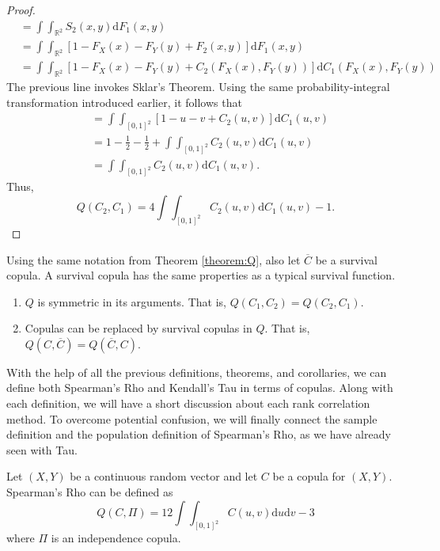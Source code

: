 \begin{proof}
\begin{align*}
        &=\int\int_{\mathbb{R}^2}S_2\left(x,y\right)\mathrm{d}F_1\left(x,y\right)\\
        &=\int\int_{\mathbb{R}^2}\left[1-F_X\left(x\right)-F_Y\left(y\right)+F_2\left(x,y\right)\right]\mathrm{d}F_1\left(x,y\right)\\
        &=\int\int_{\mathbb{R}^2}\left[1-F_X\left(x\right)-F_Y\left(y\right)+C_2\left(F_X\left(x\right),F_Y\left(y\right)\right)\right]\mathrm{d}C_1\left(F_X\left(x\right),F_Y\left(y\right)\right)
    \end{align*}
    The previous line invokes Sklar's Theorem. Using the same probability-integral transformation introduced earlier, it follows that
    \begin{align*}
        &=\int\int_{[0,1]^2}\left[1-u-v+C_2\left(u,v\right)\right]\mathrm{d}C_1\left(u,v\right)\\
        &=1-\frac{1}{2}-\frac{1}{2}+\int\int_{[0,1]^2}C_2\left(u,v\right)\mathrm{d}C_1\left(u,v\right)\\
        &=\int\int_{[0,1]^2}C_2\left(u,v\right)\mathrm{d}C_1\left(u,v\right).
    \end{align*}
    Thus, $$Q\left(C_2,C_1\right)=4\int\int_{[0,1]^2}C_2\left(u,v\right)\mathrm{d}C_1\left(u,v\right)-1.$$
\end{proof}
\begin{corollary}
    Using the same notation from Theorem \ref{theorem:Q}, also let $\overline{C}$ be a survival copula. A survival copula has the same properties as a typical survival function.
    \begin{enumerate}
        \item $Q$ is symmetric in its arguments. That is, $Q\left(C_1,C_2\right)=Q\left(C_2,C_1\right)$.
        \item Copulas can be replaced by survival copulas in $Q$. That is, $Q\left(C,\overline{C}\right)=Q\left(\overline{C},C\right)$.
    \end{enumerate}
\end{corollary}
With the help of all the previous definitions, theorems, and corollaries, we can define both Spearman's Rho and Kendall's Tau in terms of copulas. Along with each definition, we will have a short discussion about each rank correlation method. To overcome potential confusion, we will finally connect the sample definition and the population definition of Spearman's Rho, as we have already seen with Tau.
\begin{theorem}\label{theorem:rho}
     Let $\left(X,Y\right)$ be a continuous random vector and let $C$ be a copula for $\left(X,Y\right)$. Spearman's Rho can be defined as $$Q\left(C,\Pi\right)=12\int\int_{[0,1]^2}C\left(u,v\right)\mathrm{d}u\mathrm{d}v-3$$ where $\Pi$ is an independence copula.
\end{theorem}
